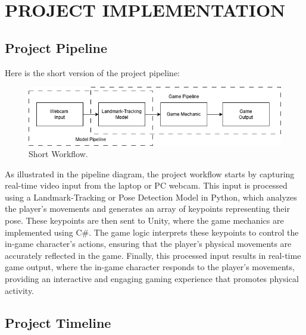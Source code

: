 \documentclass[12pt]{article}
\begin{document}
\clearpage
\section{PROJECT IMPLEMENTATION}
\subsection{Project Pipeline}
\hspace*{1.5em}Here is the short version of the project pipeline: 
\begin{figure}[h]
    \centering
    \includegraphics[width=1\textwidth]{short.drawio.png}
    \caption{Short Workflow.}
\end{figure}

As illustrated in the pipeline diagram, the project workflow starts by capturing real-time video input from the laptop or PC webcam. This input is processed using a Landmark-Tracking or Pose Detection Model in Python, which analyzes the player's movements and generates an array of keypoints representing their pose. These keypoints are then sent to Unity, where the game mechanics are implemented using C\#. The game logic interprets these keypoints to control the in-game character's actions, ensuring that the player's physical movements are accurately reflected in the game. Finally, this processed input results in real-time game output, where the in-game character responds to the player's movements, providing an interactive and engaging gaming experience that promotes physical activity.

\subsection{Project Timeline}
\end{document}
